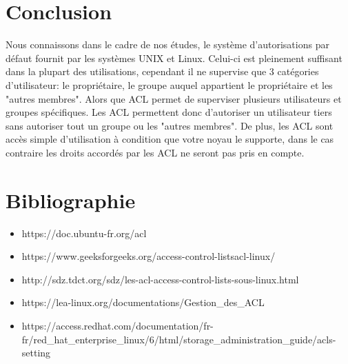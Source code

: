 \documentclass{article}
\begin{document}
\section{Conclusion}
Nous connaissons dans le cadre de nos études, le système d'autorisations par défaut fournit par les systèmes UNIX et Linux.
Celui-ci est pleinement suffisant dans la plupart des utilisations, cependant il ne supervise que 3 catégories d'utilisateur:
le propriétaire, le groupe auquel appartient le propriétaire et les "autres membres".
Alors que ACL permet de superviser plusieurs utilisateurs et groupes spécifiques. 
Les ACL permettent donc d'autoriser un utilisateur tiers sans autoriser tout un groupe ou les "autres membres".
De plus, les ACL sont accès simple d'utilisation à condition que votre noyau le supporte, dans le cas contraire les droits accordés par les ACL
ne seront pas pris en compte.
\newpage
\section{Bibliographie}
\begin{itemize}
\item https://doc.ubuntu-fr.org/acl
\item https://www.geeksforgeeks.org/access-control-listsacl-linux/
\item http://sdz.tdct.org/sdz/les-acl-access-control-lists-sous-linux.html
\item https://lea-linux.org/documentations/Gestion\_des\_ACL
\item https://access.redhat.com/documentation/fr-fr/red\_hat\_enterprise\_linux/6/html/storage\_administration\_guide/acls-setting

\end{itemize}
\end{document}
